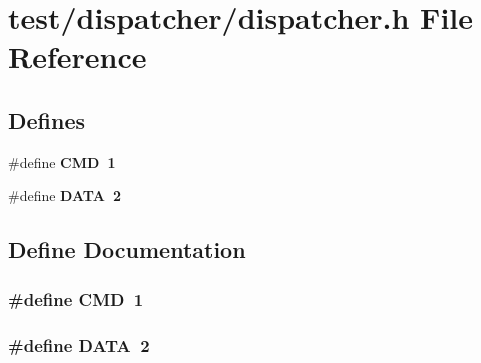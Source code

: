 \section{test/dispatcher/dispatcher.h File Reference}
\label{dispatcher_8h}
\subsection*{Defines}
\begin{CompactItemize}
\item 
\#define \bf{CMD}~1
\item 
\#define \bf{DATA}~2
\end{CompactItemize}


\subsection{Define Documentation}
\subsubsection{\setlength{\rightskip}{0pt plus 5cm}\#define CMD~1}\label{dispatcher_8h_0a5ceb9ceb914e08d345410b561cb37a}


\subsubsection{\setlength{\rightskip}{0pt plus 5cm}\#define DATA~2}\label{dispatcher_8h_ad9ae913bdfab20dd94ad04ee2d5b045}


